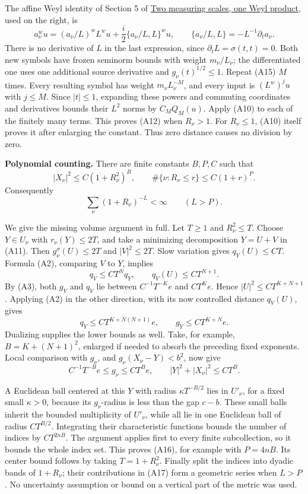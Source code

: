 \documentclass[
  11pt,
]{article}
\begin{document}
The affine Weyl identity of Section 5 of
\href{weyl-metric-products.pdf}{Two measuring scales, one Weyl product},
used on the right, is \[
a_\nu^wu
=(a_\nu/L)^w L^wu
+\frac{i}{2}\{a_\nu/L,L\}^wu,
\qquad
\{a_\nu/L,L\}=-L^{-1}\partial_t a_\nu.
\tag{A15}
\] There is no derivative of \(L\) in the last expression, since
\(\partial_t L=\sigma(t,t)=0\). Both new symbols have frozen seminorm
bounds with weight \(m_\nu/L_\nu\); the differentiated one uses one
additional source derivative and \(g_\nu(t)^{1/2}\le1\). Repeat (A15)
\(M\) times. Every resulting symbol has weight \(m_\nu L_\nu^{-M}\), and
every input is \((L^w)^j u\) with \(j\le M\). Since \(|t|\le1\),
expanding these powers and commuting coordinates and derivatives bounds
their \(L^2\) norms by \(C_MQ_M(u)\). Apply (A10) to each of the
finitely many terms. This proves (A12) when \(R_\nu>1\). For
\(R_\nu\le1\), (A10) itself proves it after enlarging the constant. Thus
zero distance causes no division by zero.

\textbf{Polynomial counting.} There are finite constants \(B,P,C\) such
that \[
|X_\nu|^2\le C(1+R_\nu^2)^B,\qquad
\#\{\nu:R_\nu\le r\}\le C(1+r)^P.
\tag{A16}
\] Consequently \[
\sum_\nu(1+R_\nu)^{-L}<\infty\qquad(L>P).
\tag{A17}
\]

We give the missing volume argument in full. Let \(T\ge1\) and
\(R_\nu^2\le T\). Choose \(Y\in U_\nu\) with \(r_\nu(Y)\le2T\), and take
a minimizing decomposition \(Y=U+V\) in (A11). Then
\(g_\nu^\sigma(U)\le2T\) and \(|V|^2\le2T\). Slow variation gives
\(q_Y(U)\le C T\). Formula (A2), comparing \(V\) to \(Y\), implies \[
q_V\le CT^Nq_Y,\qquad q_V(U)\le CT^{N+1}.
\tag{A18}
\] By (A3), both \(g_V\) and \(q_V\) lie between \(C^{-1}T^{-K}e\) and
\(CT^Ke\). Hence \(|U|^2\le CT^{K+N+1}\). Applying (A2) in the other
direction, with its now controlled distance \(q_V(U)\), gives \[
q_Y\le CT^{K+N(N+1)}e,
\qquad
g_Y\le CT^{K+N}e.
\tag{A19}
\] Dualizing supplies the lower bounds as well. Take, for example,
\(B=K+(N+1)^2\), enlarged if needed to absorb the preceding fixed
exponents. Local comparison with \(g_\nu\), and \(g_\nu(X_\nu-Y)<b^2\),
now give \[
C^{-1}T^{-B}e\le g_\nu\le CT^Be,\qquad
|Y|^2+|X_\nu|^2\le CT^B.
\tag{A20}
\]

A Euclidean ball centered at this \(Y\) with radius \(\kappa T^{-B/2}\)
lies in \(U'_\nu\), for a fixed small \(\kappa>0\), because its
\(g_\nu\)-radius is less than the gap \(c-b\). These small balls inherit
the bounded multiplicity of \(U'_\nu\), while all lie in one Euclidean
ball of radius \(C T^{B/2}\). Integrating their characteristic functions
bounds the number of indices by \(CT^{2nB}\). The argument applies first
to every finite subcollection, so it bounds the whole index set. This
proves (A16), for example with \(P=4nB\). Its center bound follows by
taking \(T=1+R_\nu^2\). Finally split the indices into dyadic bands of
\(1+R_\nu\); their contributions in (A17) form a geometric series when
\(L>P\). No uncertainty assumption or bound on a vertical part of the
metric was used.
\end{document}
